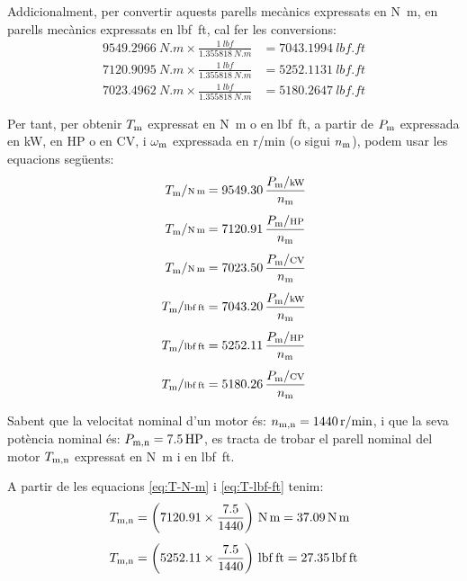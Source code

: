 Addicionalment, per  convertir aquests parells mecànics expressats en \unit{N.m}, en parells mecànics expressats en \unit{lbf.ft}, cal  fer les conversions:
\begin{subequations}
\begin{align}
    \qty{9549,2966}{N.m} \times \frac{\qty{1}{lbf}}{\qty{1,355818}{N.m}} &= \qty{7043,1994}{lbf.ft} \\[1ex]
    \qty{7120,9095}{N.m} \times \frac{\qty{1}{lbf}}{\qty{1,355818}{N.m}} &= \qty{5252,1131}{lbf.ft} \\[1ex]
    \qty{7023,4962}{N.m} \times \frac{\qty{1}{lbf}}{\qty{1,355818}{N.m}} &= \qty{5180,2647}{lbf.ft}
\end{align}
\end{subequations}

Per tant, per  obtenir $T_\mathrm{m}$ expressat en \unit{N.m} o en \unit{lbf.ft}, a partir de $P_\mathrm{m}$ expressada en kW, en HP o en CV, i $\omega_\mathrm{m}$ expressada en \unit{r/min} (o sigui $n_\mathrm{m}$),  podem usar les equacions següents:
\begin{subequations}
\begin{align}
    T\ped{m}/{\scriptstyle \unit{N.m}} &= \num{9549,30}\,  \frac{P\ped{m}/{\scriptstyle \unit{kW}}}{n\ped{m}} \\[1ex]
    T\ped{m}/{\scriptstyle \unit{N.m}} &= \num{7120,91}\,  \frac{P\ped{m}/{\scriptstyle \unit{HP}}}{n\ped{m}}\label{eq:T-N-m} \\[1ex]
    T\ped{m}/{\scriptstyle \unit{N.m}} &= \num{7023,50}\,  \frac{P\ped{m}/{\scriptstyle \unit{CV}}}{n\ped{m}} \\[1ex]
    T\ped{m}/{\scriptstyle \unit{lbf.ft}} &= \num{7043,20}\,  \frac{P\ped{m}/{\scriptstyle \unit{kW}}}{n\ped{m}} \\[1ex]
    T\ped{m}/{\scriptstyle \unit{lbf.ft}} &= \num{5252,11}\,  \frac{P\ped{m}/{\scriptstyle \unit{HP}}}{n\ped{m}}\label{eq:T-lbf-ft} \\[1ex]
    T\ped{m}/{\scriptstyle \unit{lbf.ft}} &= \num{5180,26}\,  \frac{P\ped{m}/{\scriptstyle \unit{CV}}}{n\ped{m}}
\end{align}
\end{subequations}

	
\begin{exemple}[\MotorParellNom{}]
	\addcontentsxms{\MotorParellNom}
    Sabent que la velocitat nominal d'un motor és: $n_\mathrm{m,n} = \qty{1440}{r/min}$, i que la seva potència nominal és: $P_\mathrm{m,n} = \qty{7,5}{HP}$,   es tracta de trobar el parell nominal del motor $T_\mathrm{m,n}$ expressat en \unit{N.m} i en \unit{lbf.ft}.

    A partir de les equacions  \eqref{eq:T-N-m} i \eqref{eq:T-lbf-ft} tenim:
    \begin{align*}
      T\ped{m,n} &= \left(\num{7120,91} \times \frac{\num{7,5}}{1440}\right)
      \,\unit{N.m} = \qty{37,09}{N.m} \\[1ex]
      T\ped{m,n} &= \left(\num{5252,11} \times \frac{\num{7,5}}{1440}\right)
      \,\unit{lbf.ft} = \qty{27,35}{lbf.ft}
    \end{align*}
\end{exemple}


